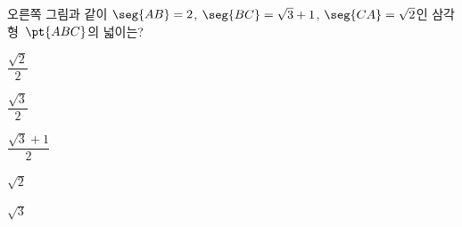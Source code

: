 \noindent\begin{minipage}[t]{0.58\linewidth}\vspace{0pt}\raggedright 오른쪽 그림과 같이 $\seg{AB}=2$, $\seg{BC}=\sqrt{3}+1$, $\seg{CA}=\sqrt{2}$인 삼각형~$\pt{ABC}$의 넓이는?\end{minipage}\hfill\begin{minipage}[t]{0.4\linewidth}\vspace{0pt}\centering \resizebox{\ifdim\width>\linewidth\linewidth\else\width\fi}{!}{}\end{minipage}\par
\begin{choices32}{\rule[-3ex]{0pt}{8ex}$\dfrac{\sqrt{2}}{2}$}{\rule[-3ex]{0pt}{8ex}$\dfrac{\sqrt{3}}{2}$}{\rule[-3ex]{0pt}{8ex}$\dfrac{\sqrt{3}+1}{2}$}{\rule[-3ex]{0pt}{8ex}$\sqrt{2}$}{\rule[-3ex]{0pt}{8ex}$\sqrt{3}$}\end{choices32}
